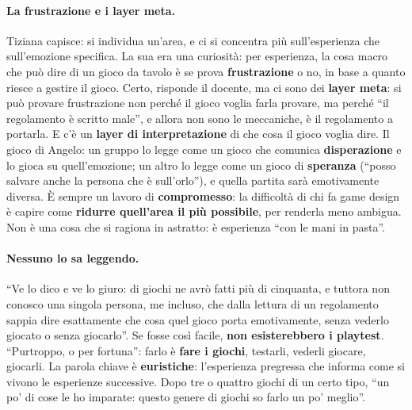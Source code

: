 \paragraph{La frustrazione e i layer meta.} Tiziana capisce: si individua un'area, e ci
si concentra più sull'esperienza che sull'emozione specifica. La sua era una curiosità:
per esperienza, la cosa macro che può dire di un gioco da tavolo è se prova
\textbf{frustrazione} o no, in base a quanto riesce a gestire il gioco. Certo, risponde
il docente, ma ci sono dei \textbf{layer meta}: si può provare frustrazione non perché
il gioco voglia farla provare, ma perché ``il regolamento è scritto male'', e allora
non sono le meccaniche, è il regolamento a portarla. E c'è un \textbf{layer di
interpretazione} di che cosa il gioco voglia dire. Il gioco di Angelo: un gruppo lo
legge come un gioco che comunica \textbf{disperazione} e lo gioca su quell'emozione;
un altro lo legge come un gioco di \textbf{speranza} (``posso salvare anche la persona
che è sull'orlo''), e quella partita sarà emotivamente diversa. È sempre un lavoro di
\textbf{compromesso}: la difficoltà di chi fa game design è capire come
\textbf{ridurre quell'area il più possibile}, per renderla meno ambigua. Non è una cosa
che si ragiona in astratto: è esperienza ``con le mani in pasta''.

\paragraph{Nessuno lo sa leggendo.} ``Ve lo dico e ve lo giuro: di giochi ne avrò fatti
più di cinquanta, e tuttora non conosco una singola persona, me incluso, che dalla
lettura di un regolamento sappia dire esattamente che cosa quel gioco porta
emotivamente, senza vederlo giocato o senza giocarlo''. Se fosse così facile,
\textbf{non esisterebbero i playtest}. ``Purtroppo, o per fortuna'': farlo è
\textbf{fare i giochi}, testarli, vederli giocare, giocarli. La parola chiave è
\textbf{euristiche}: l'esperienza pregressa che informa come si vivono le esperienze
successive. Dopo tre o quattro giochi di un certo tipo, ``un po' di cose le ho
imparate: questo genere di giochi so farlo un po' meglio''.

